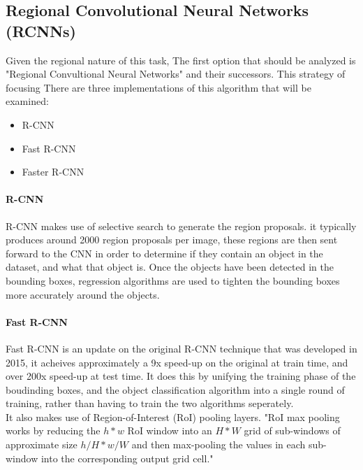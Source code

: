 \documentclass[10pt]{article}
\begin{document}
\subsection{Regional Convolutional Neural Networks (RCNNs)}
	Given the regional nature of this task, The first option that should be analyzed is "Regional Convultional Neural Networks" and their successors. This strategy of focusing  There are three implementations of this algorithm that will be examined:
	\begin{itemize}
		\item R-CNN \cite{rcnn}
		\item Fast R-CNN \cite{fast_rcnn}
		\item Faster R-CNN \cite{faster_rcnn}
	\end{itemize}
	
\paragraph{R-CNN}
R-CNN \cite{rcnn} makes use of selective search to generate the region proposals. it typically produces around 2000 region proposals per image, these regions are then sent forward to the CNN in order to determine if they contain an object in the dataset, and what that object is. Once the objects have been detected in the bounding boxes, regression algorithms are used to tighten the bounding boxes more accurately around the objects.

\paragraph{Fast R-CNN}
Fast R-CNN \cite{fast_rcnn} is an update on the original R-CNN technique that was developed in 2015, it acheives approximately a 9x speed-up on the original at train time, and over 200x speed-up at test time. It does this by unifying the training phase of the boudinding boxes, and the object classification algorithm into a single round of training, rather than having to train the two algorithms seperately. \\
It also makes use of Region-of-Interest (RoI) pooling layers. "RoI max pooling works by reducing the $h*w$ RoI window into an $H*W$ grid of sub-windows of approximate size $h/H * w/W$ and then max-pooling the values in each sub-window into the corresponding output grid cell."\cite{fast_rcnn}
\end{document}
